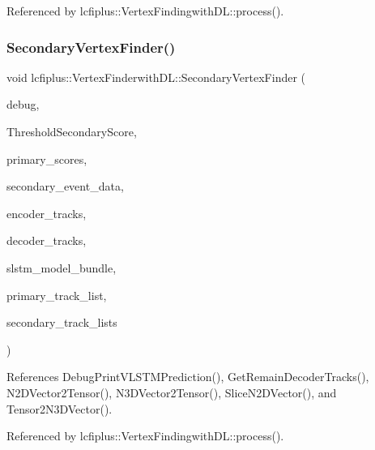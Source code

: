 Referenced by lcfiplus\+::\+Vertex\+Findingwith\+D\+L\+::process().

\mbox{\label{namespacelcfiplus_1_1VertexFinderwithDL_a1b960269e87cc039ad8afab187a43f87}} 
\subsubsection{Secondary\+Vertex\+Finder()}
{\footnotesize\ttfamily void lcfiplus\+::\+Vertex\+Finderwith\+D\+L\+::\+Secondary\+Vertex\+Finder (\begin{DoxyParamCaption}\item[{bool}]{debug,  }\item[{double}]{Threshold\+Secondary\+Score,  }\item[{std\+::vector$<$ double $>$}]{primary\+\_\+scores,  }\item[{std\+::vector$<$ std\+::vector$<$ double $>$ $>$}]{secondary\+\_\+event\+\_\+data,  }\item[{std\+::vector$<$ std\+::vector$<$ double $>$ $>$}]{encoder\+\_\+tracks,  }\item[{std\+::vector$<$ std\+::vector$<$ double $>$ $>$}]{decoder\+\_\+tracks,  }\item[{tensorflow\+::\+Saved\+Model\+Bundle\+Lite \&}]{slstm\+\_\+model\+\_\+bundle,  }\item[{std\+::vector$<$ int $>$ \&}]{primary\+\_\+track\+\_\+list,  }\item[{std\+::vector$<$ std\+::vector$<$ int $>$ $>$ \&}]{secondary\+\_\+track\+\_\+lists }\end{DoxyParamCaption})}



References Debug\+Print\+V\+L\+S\+T\+M\+Prediction(), Get\+Remain\+Decoder\+Tracks(), N2\+D\+Vector2\+Tensor(), N3\+D\+Vector2\+Tensor(), Slice\+N2\+D\+Vector(), and Tensor2\+N3\+D\+Vector().



Referenced by lcfiplus\+::\+Vertex\+Findingwith\+D\+L\+::process().

\mbox{\label{namespacelcfiplus_1_1VertexFinderwithDL_ad3a77d621d3426891785935a67473c83}} 
